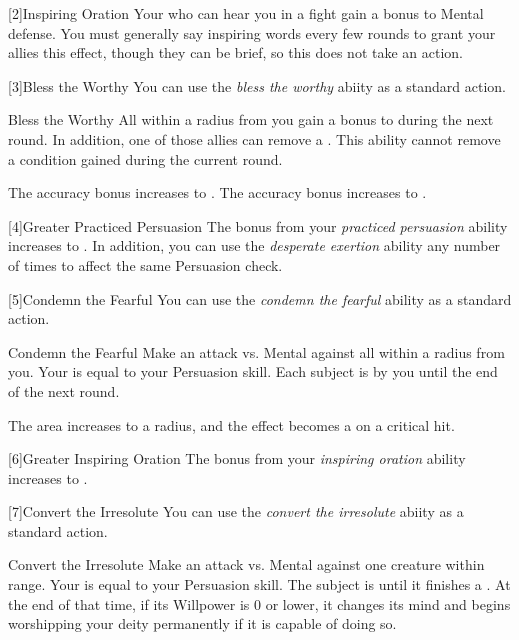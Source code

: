         [2]{Inspiring Oration} Your  who can hear you in a fight gain a  bonus to Mental defense.
        You must generally say inspiring words every few rounds to grant your allies this effect, though they can be brief, so this does not take an action.

        [3]{Bless the Worthy} You can use the \textit{bless the worthy} abiity as a standard action.
        \begin{instantability}{Bless the Worthy}
            All  within a \hugearea radius from you gain a  bonus to  during the next round.
            In addition, one of those allies can remove a .
            This ability cannot remove a condition gained during the current round.

            \rankline
             The accuracy bonus increases to .
             The accuracy bonus increases to .
        \end{instantability}

        [4]{Greater Practiced Persuasion} The bonus from your \textit{practiced persuasion} ability increases to .
        In addition, you can use the \textit{desperate exertion} ability any number of times to affect the same Persuasion check.

        [5]{Condemn the Fearful} You can use the \textit{condemn the fearful} ability as a standard action.
        \begin{instantability}{Condemn the Fearful}
            Make an attack vs. Mental against all  within a \medarea radius from you.
            Your  is equal to your Persuasion skill.
            \hit Each subject is \frightened by you until the end of the next round.

            \rankline
             The area increases to a \largearea radius, and the effect becomes a  on a critical hit.
        \end{instantability}

        [6]{Greater Inspiring Oration} The bonus from your \textit{inspiring oration} ability increases to .

        [7]{Convert the Irresolute} You can use the \textit{convert the irresolute} abiity as a standard action.
        \begin{instantability}{Convert the Irresolute}
            Make an attack vs. Mental against one creature within \rngmed range.
            Your  is equal to your Persuasion skill.
            \hit The subject is  until it finishes a .
            At the end of that time, if its Willpower is 0 or lower, it changes its mind and begins worshipping your deity permanently if it is capable of doing so.
        \end{instantability}

